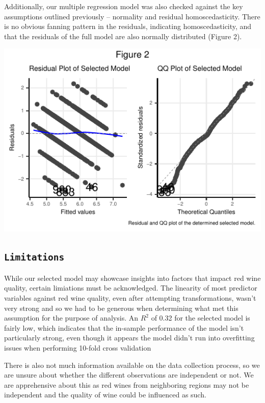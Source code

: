 \documentclass[letterpaper,8pt,twocolumn,twoside,]{pinp}
\begin{document}
Additionally, our multiple regression model was also checked against the
key assumptions outlined previously -- normality and residual
homoscedasticity. There is no obvious fanning pattern in the residuals,
indicating homoscedasticity, and that the residuals of the full model
are also normally distributed (Figure 2).

\begin{center}\includegraphics{DATA2002_ExecutiveSummary_files/figure-latex/unnamed-chunk-3-1} \end{center}

\hypertarget{limitations}{%
\subsection{\texorpdfstring{\texttt{Limitations}}{Limitations}}\label{limitations}}

While our selected model may showcase insights into factors that impact
red wine quality, certain limiations must be acknowledged. The linearity
of most predictor variables against red wine quality, even after
attempting transformations, wasn't very strong and so we had to be
generous when determining what met this assumption for the purpose of
analysis. An \(R^2\) of 0.32 for the selected model is fairly low, which
indicates that the in-sample performance of the model isn't particularly
strong, even though it appears the model didn't run into overfitting
issues when performing 10-fold cross validation

There is also not much information available on the data collection
process, so we are unsure about whether the different observations are
independent or not. We are apprehensive about this as red wines from
neighboring regions may not be independent and the quality of wine could
be influenced as such.
\end{document}
